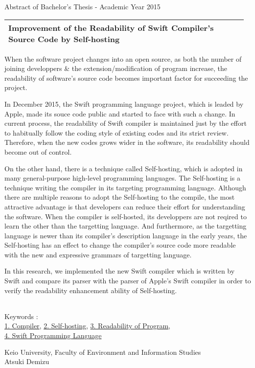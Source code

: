 Abstract of Bachelor's Thesis - Academic Year 2015
\begin{center}
\begin{large}
    \begin{tabular}{|p{0.97\linewidth}|} \hline
Improvement of the Readability of Swift Compiler's Source Code by Self-hosting
\\
\hline
\end{tabular}
\end{large}
\end{center}

When the software project changes into an open source, as both the number of joining developpers \& the extension/modification of program increase, the readability of software's source code becomes important factor for succeeding the project.

In December 2015, the Swift programming language project, which is leaded by Apple, made its souce code public and started to face with such a change.
In current process, the readability of Swift compiler is maintained just by the effort to habitually follow the coding style of existing codes and its strict review.
Therefore, when the new codes grows wider in the software, its readability should become out of control.

On the other hand, there is a technique called Self-hosting, which is adopted in many general-purpose high-level programming languages.
The Self-hosting is a technique writing the compiler in its targeting programming language.
Although there are multiple reasons to adopt the Self-hosting to the compile, the most attractive advantage is that developers can reduce their effort for understanding the software.
When the compiler is self-hosted, its developpers are not reqired to learn the other than the targetting language.
And furthermore, as the targetting language is newer than its compiler's description language in the early years, the Self-hosting has an effect to change the compiler's source code more readable with the new and expressive grammars of targetting language.

In this research, we implemented the new Swift compiler which is written by Swift and compare its parser with the parser of Apple's Swift compiler in order to verify the readability enhancement ability of Self-hosting.

~ \\
Keywords : \\
\underline{1. Compiler},
\underline{2. Self-hosting},
\underline{3. Readability of Program},\\
\underline{4. Swift Programming Language}
\begin{flushright}
Keio University, Faculty of Environment and Information Studies\\
Atsuki Demizu
\end{flushright}
